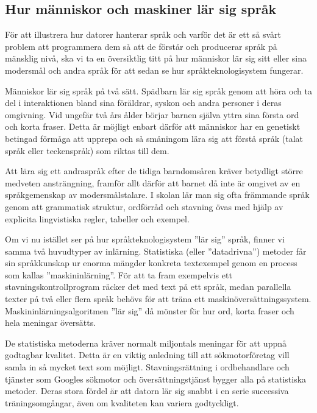 \begin{multicols}{2}
\subsection{Hur människor och maskiner lär sig språk}

För att illustrera hur datorer hanterar språk och varför det är ett så
svårt problem att programmera dem så att de förstår och producerar
språk på mänsklig nivå, ska vi ta en översiktlig titt på hur människor
lär sig sitt eller sina modersmål och andra språk för att sedan se hur
språkteknologisystem fungerar.


Människor lär sig språk på två sätt. Spädbarn lär sig språk genom att
höra och ta del i interaktionen bland sina föräldrar, syskon och andra
personer i deras omgivning. Vid ungefär två års ålder börjar barnen
själva yttra sina första ord och korta fraser. Detta är möjligt enbart
därför att människor har en genetiskt betingad förmåga att upprepa och
så småningom lära sig att förstå språk (talat språk eller teckenspråk)
som riktas till dem.

Att lära sig ett andraspråk efter de tidiga barn\-doms\-åren kräver
betydligt större medveten ansträngning, framför allt därför att barnet
då inte är omgivet av en språkgemenskap av modersmålstalare. I skolan
lär man sig ofta främmande språk genom att grammatisk struktur,
ordförråd och stavning övas med hjälp av explicita lingvistiska
regler, tabeller och exempel.

Om vi nu istället ser på hur språkteknologisystem ''lär sig'' språk,
finner vi samma två huvudtyper av inlärning. Statistiska (eller
''datadrivna'') metoder får sin språkkunskap ur enorma mängder
konkreta textexempel genom en process som kallas
''maskin\-in\-lär\-ning''. För att ta fram exempelvis ett
stavningskontrollprogram räcker det med text på ett språk, medan
parallella texter på två eller flera språk behövs för att träna ett
maskin\-över\-sätt\-ningssystem. Maskininlärningsalgoritmen ''lär sig'' då
mönster för hur ord, korta fraser och hela meningar översätts.

De statistiska metoderna kräver normalt miljontals meningar för att
uppnå godtagbar kvalitet. Detta är en viktig anledning till att
sökmotorföretag vill samla in så mycket text som
möjligt. Stavningsrättning i ordbehandlare och tjänster som Googles
sökmotor och översättningstjänst bygger alla på statistiska
metoder. Deras stora fördel är att datorn lär sig snabbt i en
serie successiva träningsomgångar, även om kvaliteten kan variera
godtyckligt.


\end{multicols}
